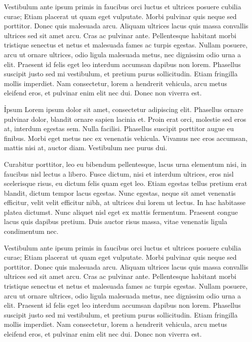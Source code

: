 \documentclass{novella}
\begin{document}
Vestibulum ante ipsum primis in faucibus orci luctus et ultrices posuere cubilia curae; Etiam placerat ut quam eget vulputate. Morbi pulvinar quis neque sed porttitor. Donec quis malesuada arcu. Aliquam ultrices lacus quis massa convallis ultrices sed sit amet arcu. Cras ac pulvinar ante. Pellentesque habitant morbi tristique senectus et netus et malesuada fames ac turpis egestas. Nullam posuere, arcu ut ornare ultrices, odio ligula malesuada metus, nec dignissim odio urna a elit. Praesent id felis eget leo interdum accumsan dapibus non lorem. Phasellus suscipit justo sed mi vestibulum, et pretium purus sollicitudin. Etiam fringilla mollis imperdiet. Nam consectetur, lorem a hendrerit vehicula, arcu metus eleifend eros, et pulvinar enim elit nec dui. Donec non viverra est.

\h{Ipsum}
Lorem ipsum dolor sit amet, consectetur adipiscing elit. Phasellus ornare pulvinar dolor, blandit ornare sapien lacinia et. Proin erat orci, molestie sed eros at, interdum egestas sem. Nulla facilisi. Phasellus suscipit porttitor augue eu finibus. Morbi eget metus nec ex venenatis vehicula. Vivamus nec eros accumsan, mattis nisi at, auctor diam. Vestibulum nec purus dui.

Curabitur porttitor, leo eu bibendum pellentesque, lacus urna elementum nisi, in faucibus nisl lectus a libero. Fusce dictum, nisi et interdum ultrices, eros nisl scelerisque risus, eu dictum felis quam eget leo. Etiam egestas tellus pretium erat blandit, dictum tempor lacus egestas. Nunc egestas, neque sit amet venenatis efficitur, velit velit efficitur nibh, at ultrices dui lorem ut lectus. In hac habitasse platea dictumst. Nunc aliquet nisl eget ex mattis fermentum. Praesent congue lacus quis dapibus pretium. Duis auctor risus massa, vitae venenatis ligula condimentum nec.

Vestibulum ante ipsum primis in faucibus orci luctus et ultrices posuere cubilia curae; Etiam placerat ut quam eget vulputate. Morbi pulvinar quis neque sed porttitor. Donec quis malesuada arcu. Aliquam ultrices lacus quis massa convallis ultrices sed sit amet arcu. Cras ac pulvinar ante. Pellentesque habitant morbi tristique senectus et netus et malesuada fames ac turpis egestas. Nullam posuere, arcu ut ornare ultrices, odio ligula malesuada metus, nec dignissim odio urna a elit. Praesent id felis eget leo interdum accumsan dapibus non lorem. Phasellus suscipit justo sed mi vestibulum, et pretium purus sollicitudin. Etiam fringilla mollis imperdiet. Nam consectetur, lorem a hendrerit vehicula, arcu metus eleifend eros, et pulvinar enim elit nec dui. Donec non viverra est.
\end{document}
